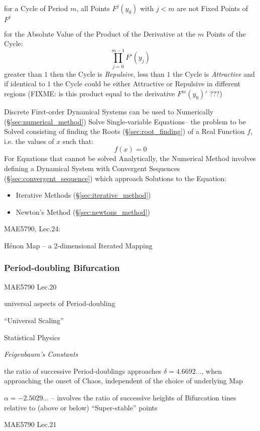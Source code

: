 for a Cycle of Period $m$, all Points $F^j(y_0)$ with $j < m$ are not Fixed
Points of $F^j$

for the Absolute Value of the Product of the Derivative at the $m$ Points of the
Cycle:
\[
  \prod_{j=0}^{m-1} F'(y_j)
\]
greater than $1$ then the Cycle is \emph{Repulsive}, less than $1$ the Cycle is
\emph{Attractive} and if identical to $1$ the Cycle could be either Attractive
or Repulsive in different regions
(FIXME: is this product equal to the derivative $F^m(y_0)'$ ???)

Discrete First-order Dynamical Systems can be used to Numerically
(\S\ref{sec:numerical_method}) Solve Single-variable Equations-- the problem to
be Solved consisting of finding the Roots (\S\ref{sec:root_finding}) of a Real
Function $f$, i.e. the values of $x$ such that:
\[
  f(x) = 0
\]
For Equations that cannot be solved Analytically, the Numerical Method involves
defining a Dynamical System with Convergent Sequences
(\S\ref{sec:convergent_sequence}) which approach Solutions to the Equation:
\begin{itemize}
  \item Iterative Methods (\S\ref{sec:iterative_method})
  \item Newton's Method (\S\ref{sec:newtons_method})
\end{itemize}


MAE5790, Lec.24:

H\'enon Map -- a 2-dimensional Iterated Mapping



\subsubsection{Period-doubling Bifurcation}\label{sec:period_doubling}

MAE5790 Lec.20

universal aspects of Period-doubling

``Universal Scaling''

Statistical Physics

\emph{Feigenbaum's Constants}

the ratio of successive Period-doublings approaches $\delta = 4.6692...$, when
approaching the onset of Chaos, independent of the choice of underlying Map

$\alpha = -2.5029...$ -- involves the ratio of successive heights of Bifurcation
tines relative to (above or below) ``Super-stable'' points

MAE5790 Lec.21

